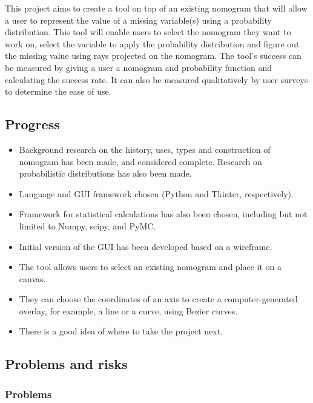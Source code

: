 \documentclass[11pt]{article}
\begin{document}
This project aims to create a tool on top of an existing nomogram that will allow a user to represent the value of a missing variable(s) using a probability distribution. This tool will enable users to select the nomogram they want to work on, select the variable to apply the probability distribution and figure out the missing value using rays projected on the nomogram. The tool's success can be measured by giving a user a nomogram and probability function and calculating the success rate. It can also be measured qualitatively by user surveys to determine the ease of use. 

\subsection{Progress}\label{progress}

\begin{itemize}
    \item Background research on the history, uses, types and construction of nomogram has been made, and considered complete. Research on probabilistic distributions has also been made.
    \item Language and GUI framework chosen (Python and Tkinter, respectively). 
    \item Framework for statistical calculations has also been chosen, including but not limited to Numpy, scipy, and PyMC. 
    \item Initial version of the GUI has been developed based on a wireframe. 
    
    \item The tool allows users to select an existing nomogram and place it on a canvas.
    \item They can choose the coordinates of an axis to create a computer-generated overlay, for example, a line or a curve, using Bezier curves. 
    
    \item There is a good idea of where to take the project next.  
    
\end{itemize}

\subsection{Problems and risks}\label{problems-and-risks}

\subsubsection{Problems}\label{problems}
\end{document}

